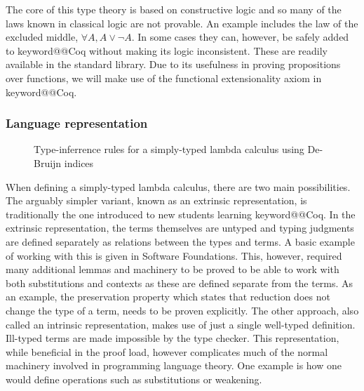 \documentclass[11pt, final]{article}
\makeatletter
\def\<#1>{\csname keyword@@#1\endcsname}
\makeatother
\begin{document}
The core of this type theory is based on constructive logic and so many of the laws known in classical logic are not provable.
An example includes the law of the excluded middle, $\forall A, A \vee \neg A$.
In some cases they can, however, be safely added to \<Coq> without making its logic inconsistent. These are readily available in the standard library.
Due to its usefulness in proving propositions over functions, we will make use of the functional extensionality axiom in \<Coq>.

\subsubsection{Language representation}
\label{sec:language_repr}

\begin{figure}
  \label{fig:stlc_infer}
  \caption{Type-inferrence rules for a simply-typed lambda calculus using De-Bruijn indices}
\end{figure}

When defining a simply-typed lambda calculus, there are two main possibilities\cite{plfa2019}.
The arguably simpler variant, known as an extrinsic representation, is traditionally the one introduced to new students learning \<Coq>.
In the extrinsic representation, the terms themselves are untyped and typing judgments are defined separately as relations between the types and terms. A basic example of working with this is given in Software Foundations\cite{Pierce:SF2}.
This, however, required many additional lemmas and machinery to be proved to be able to work with both substitutions and contexts as these are defined separate from the terms.
As an example, the preservation property which states that reduction does not change the type of a term, needs to be proven explicitly.
The other approach, also called an intrinsic representation, makes use of just a single well-typed definition.
Ill-typed terms are made impossible by the type checker.
This representation, while beneficial in the proof load, however complicates much of the normal machinery involved in programming language theory.
One example is how one would define operations such as substitutions or weakening.
\end{document}

